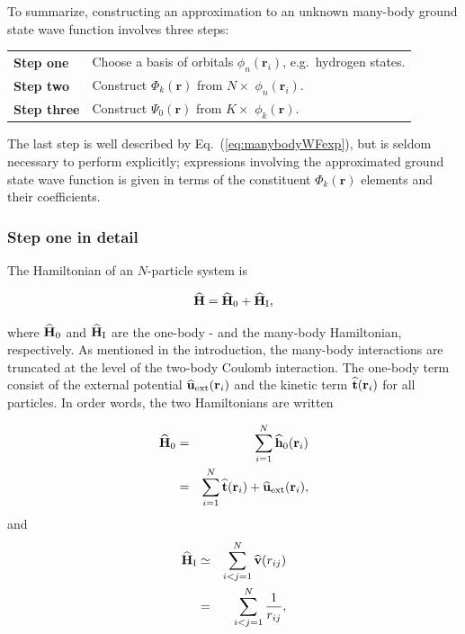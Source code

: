 To summarize, constructing an approximation to an unknown many-body ground state wave function involves three steps:

\begin{center}
\begin{tabular}{l|l}
 \textbf{Step one}   &  Choose a basis of orbitals $\phi_n(\mathbf{r}_i)$, e.g.~hydrogen states. \\
 \textbf{Step two}   &  Construct $\Phi_k(\mathbf{r})$ from $N\times$ $\phi_n(\mathbf{r}_i)$.   \\
 \textbf{Step three} &  Construct $\Psi_0(\mathbf{r})$ from $K\times$ $\phi_k(\mathbf{r})$.     \\
\end{tabular}
\end{center}

The last step is well described by Eq.~(\ref{eq:manybodyWFexp}), but is seldom necessary to perform explicitly; expressions involving the approximated ground state wave function is given in terms of the constituent $\Phi_k(\mathbf{r})$ elements and their coefficients.

\subsubsection{Step one in detail}

The Hamiltonian of an $N$-particle system is 

\begin{equation}
 {\bf\widehat{H}} = {\bf\widehat{H}}_0 + {\bf\widehat{H}}_\mathrm{I},
\end{equation}

where ${\bf\widehat{H}}_0$ and ${\bf\widehat{H}}_\mathrm{I}$ are the one-body - and the many-body Hamiltonian, respectively. As mentioned in the introduction, the many-body interactions are truncated at the level of the two-body Coulomb interaction. The one-body term consist of the external potential ${\bf\widehat{u}}_\mathrm{ext}(\mathbf{r}_i)$ and the kinetic term ${\bf\widehat{t}}(\mathbf{r}_i)$ for all particles. In order words, the two Hamiltonians are written

\begin{eqnarray}
 {\bf\widehat{H}}_0 &=& \sum_{i=1}^N {\bf\widehat{h}}_0(\mathbf{r}_i) \\
          &=& \sum_{i=1}^N {\bf\widehat{t}}(\mathbf{r}_i) + {\bf\widehat{u}}_\mathrm{ext}(\mathbf{r}_i), \nonumber
  \end{eqnarray}
  and
\begin{eqnarray}
 {\bf\widehat{H}}_\mathrm{I} &\simeq& \sum_{i<j=1}^N {\bf\widehat{v}}(r_{ij}) \\
          &=& \sum_{i<j=1}^N \frac{1}{r_{ij}},  \nonumber
\end{eqnarray}

